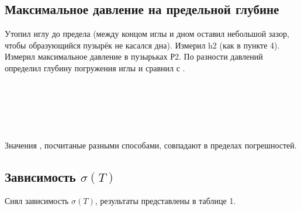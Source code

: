 \subsection{Максимальное давление на предельной глубине}

Утопил иглу до предела (между концом иглы и дном оставил небольшой зазор, чтобы образующийся пузырёк не касался дна). Измерил h2 (как в пункте 4).
Измерил максимальное давление в пузырьках Р2. По разности давлений  определил глубину погружения  иглы и сравнил с . 

\newpage

 \\

 \\

 \\

 \\

 \\

Значения , посчитаные разными способами, совпадают в пределах погрешностей.

\subsection {Зависимость $\sigma(T)$}

Снял зависимость $\sigma(T)$, результаты представлены в таблице 1.

